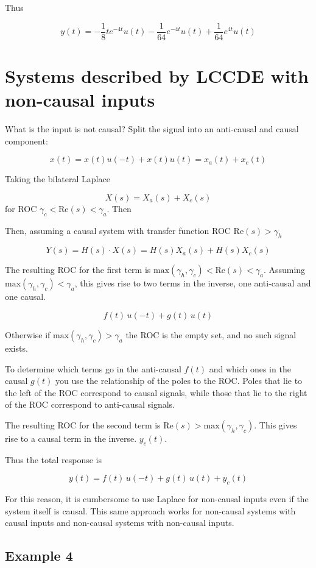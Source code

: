 \documentclass{article}
\begin{document}
Thus

$$
y(t)=-\frac{1}{8} t e^{-4 t} u(t)-\frac{1}{64} e^{-4 t} u(t)+\frac{1}{64} e^{4 t} u(t)
$$

\section{Systems described by LCCDE with non-causal inputs}

What is the input is not causal? Split the signal into an anti-causal and causal component:

$$
x(t) = x(t)u(-t) + x(t)u(t) = x_a(t) + x_c(t)
$$

Taking the bilateral Laplace

$$
X(s) = X_a(s) + X_c(s)
$$
for ROC $\gamma_c < \text{Re}(s) < \gamma_a$. Then

Then, assuming a causal system with transfer function ROC $\text{Re}(s) > \gamma_h$ 

$$
Y(s) = H(s) \cdot X(s) = H(s) X_a(s) + H(s) X_c(s) 
$$

The resulting ROC for the first term is $\text{max}(\gamma_h, \gamma_c) < \text{Re}(s) < \gamma_a$. Assuming $\text{max}(\gamma_h, \gamma_c) < \gamma_a$, this gives rise to two terms in the inverse, one anti-causal and one causal.

$$
f(t)\, u(-t) + g(t)\, u(t)
$$

Otherwise if $\text{max}(\gamma_h, \gamma_c) > \gamma_a$ the ROC is the empty set, and no such signal exists.

To determine which terms go in the anti-causal $f(t)$ and which ones in the causal $g(t)$ you use the relationship of the poles to the ROC. Poles that lie to the left of the ROC correspond to causal signals, while those that lie to the right of the ROC correspond to anti-causal signals. 

The resulting ROC for the second term is $\text{Re}(s) > \text{max}(\gamma_h, \gamma_c)$. This gives rise to a causal term in the inverse. $y_c(t)$.

Thus the total response is

$$
y(t) = f(t)\, u(-t) + g(t)\, u(t) + y_c(t)
$$

For this reason, it is cumbersome to use Laplace for non-causal inputs even if the system itself is causal. This same approach works for non-causal systems with causal inputs and non-causal systems with non-causal inputs.

\subsection{Example 4}
\end{document}
